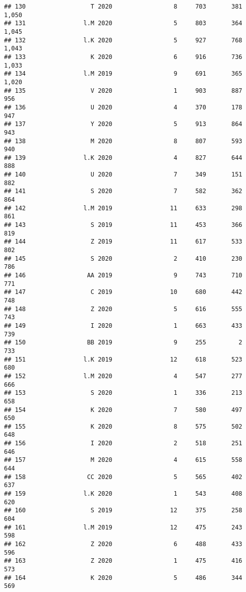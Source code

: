 \documentclass[
]{article}
\begin{document}
\begin{verbatim}
## 130                  T 2020                 8     703       381    1,050
## 131                l.M 2020                 5     803       364    1,045
## 132                l.K 2020                 5     927       768    1,043
## 133                  K 2020                 6     916       736    1,033
## 134                l.M 2019                 9     691       365    1,020
## 135                  V 2020                 1     903       887      956
## 136                  U 2020                 4     370       178      947
## 137                  Y 2020                 5     913       864      943
## 138                  M 2020                 8     807       593      940
## 139                l.K 2020                 4     827       644      888
## 140                  U 2020                 7     349       151      882
## 141                  S 2020                 7     582       362      864
## 142                l.M 2019                11     633       298      861
## 143                  S 2019                11     453       366      819
## 144                  Z 2019                11     617       533      802
## 145                  S 2020                 2     410       230      786
## 146                 AA 2019                 9     743       710      771
## 147                  C 2019                10     680       442      748
## 148                  Z 2020                 5     616       555      743
## 149                  I 2020                 1     663       433      739
## 150                 BB 2019                 9     255         2      733
## 151                l.K 2019                12     618       523      680
## 152                l.M 2020                 4     547       277      666
## 153                  S 2020                 1     336       213      658
## 154                  K 2020                 7     580       497      650
## 155                  K 2020                 8     575       502      648
## 156                  I 2020                 2     518       251      646
## 157                  M 2020                 4     615       558      644
## 158                 CC 2020                 5     565       402      637
## 159                l.K 2020                 1     543       408      620
## 160                  S 2019                12     375       258      604
## 161                l.M 2019                12     475       243      598
## 162                  Z 2020                 6     488       433      596
## 163                  Z 2020                 1     475       416      573
## 164                  K 2020                 5     486       344      569

\end{verbatim}
\end{document}
